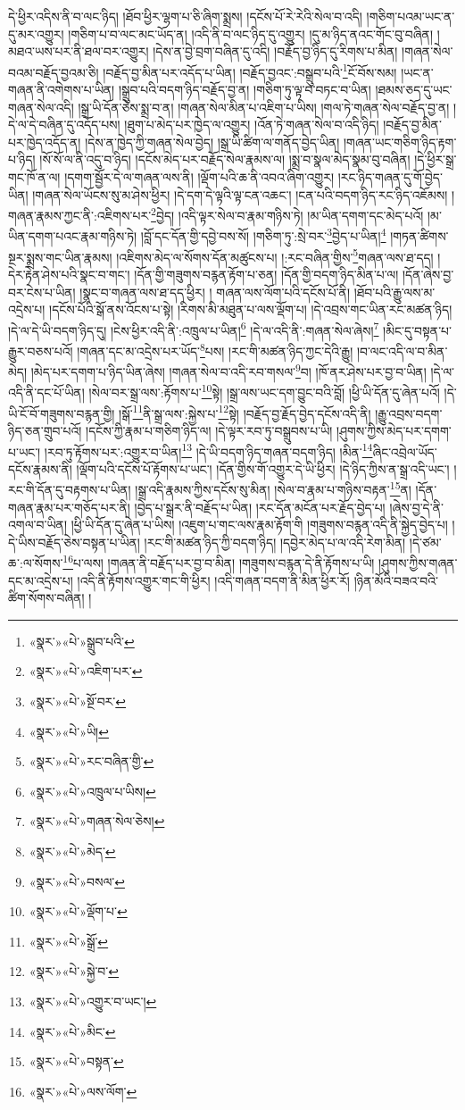 དེ་ཕྱིར་འདིས་ནི་བ་ལང་ཉིད། །ཐོབ་ཕྱིར་ལྷག་པ་ཅི་ཞིག་སྨྲས། །དངོས་པོ་རེ་རེའི་སེལ་བ་འདི། །གཅིག་པའམ་ཡང་ན་དུ་མར་འགྱུར། །གཅིག་པ་བ་ལང་མང་ཡོད་ན། །འདི་ནི་བ་ལང་ཉིད་དུ་འགྱུར། །དུ་མ་ཉིད་ནའང་གོང་བུ་བཞིན། །མཐའ་ཡས་པར་ནི་ཐལ་བར་འགྱུར། །དེས་ན་བྱེ་བྲག་བཞིན་དུ་འདི། །བརྗོད་བྱ་ཉིད་དུ་རིགས་པ་མིན། །གཞན་སེལ་བའམ་བརྗོད་བྱའམ་ཅི། །བརྗོད་བྱ་མིན་པར་འདོད་པ་ཡིན། །བརྗོད་བྱའང་:བསྒྲུབ་པའི་\footnote{«སྣར་»«པེ་»སྒྲུབ་པའི་}ངོ་བོས་སམ། །ཡང་ན་གཞན་ནི་འགེགས་པ་ཡིན། །སྒྲུབ་པའི་བདག་ཉིད་བརྗོད་བྱ་ན། །གཅིག་ཏུ་ལྟ་བ་བཏང་བ་ཡིན། །ཐམས་ཅད་དུ་ཡང་གཞན་སེལ་འདི། །སྒྲ་ཡི་དོན་ཅེས་སྨྲ་བ་ན། །གཞན་སེལ་མིན་པ་འཇིག་པ་ཡིས། །གལ་ཏེ་གཞན་སེལ་བརྗོད་བྱ་ན། །དེ་ལ་དེ་བཞིན་དུ་འདོད་པས། །ཐུག་པ་མེད་པར་ཁྱེད་ལ་འགྱུར། །འོན་ཏེ་གཞན་སེལ་བ་འདི་ཉིད། །བརྗོད་བྱ་མིན་པར་ཁྱེད་འདོད་ན། །དེས་ན་ཁྱེད་ཀྱི་གཞན་སེལ་བྱེད། །སྒྲ་ཡི་ཚིག་ལ་གནོད་བྱེད་ཡིན། །གཞན་ཡང་གཅིག་ཉིད་རྟག་པ་ཉིད། །སོ་སོ་ལ་ནི་འདུ་བ་ཉིད། །དངོས་མེད་པར་བརྗོད་སེལ་རྣམས་ལ། །སྨྲ་བ་སྣལ་མེད་སྣམ་བུ་བཞིན། །དེ་ཕྱིར་སྒྲ་གང་ཁོ་ན་ལ། །དགག་སྦྱོར་དེ་ལ་གཞན་ལས་ནི། །ལྡོག་པའི་ཆ་ནི་འབའ་ཞིག་འགྱུར། །རང་ཉིད་གཞན་དུ་གོ་བྱེད་ཡིན། །གཞན་སེལ་ཡོངས་སུ་མ་ཤེས་ཕྱིར། །དེ་དག་དེ་ལྟའི་ལྟ་ངན་འཆང་། །ངན་པའི་བདག་ཉིད་རང་ཉིད་འཇོམས། །གཞན་རྣམས་ཀྱང་ནི་:འཇིགས་པར་\footnote{«སྣར་»«པེ་»འཇིག་པར་}བྱེད། །འདི་ལྟར་སེལ་བ་རྣམ་གཉིས་ཏེ། །མ་ཡིན་དགག་དང་མེད་པའོ། །མ་ཡིན་དགག་པའང་རྣམ་གཉིས་ཏེ། །བློ་དང་དོན་གྱི་དབྱེ་བས་སོ། །གཅིག་ཏུ་:སྲེ་བར་\footnote{«སྣར་»«པེ་»སྔོ་བར་}བྱེད་པ་ཡིན།\footnote{«སྣར་»«པེ་»ཡི།} །གཏན་ཚིགས་སྔར་སྨྲས་གང་ཡིན་རྣམས། །འཇིགས་མེད་ལ་སོགས་དོན་མཚུངས་པ། །:རང་བཞིན་གྱིས་\footnote{«སྣར་»«པེ་»རང་བཞིན་གྱི་}གཞན་ལས་ཐ་དད། །དེར་རྟེན་ཤེས་པའི་སྣང་བ་གང་། །དོན་གྱི་གཟུགས་བརྙན་རྟོག་པ་ཅན། །དོན་གྱི་བདག་ཉིད་མིན་པ་ལ། །དོན་ཞེས་བྱ་བར་ངེས་པ་ཡིན། །སྣང་བ་གཞན་ལས་ཐ་དད་ཕྱིར། །
གཞན་ལས་ལོག་པའི་དངོས་པོ་ནི། །ཐོབ་པའི་རྒྱུ་ལས་མ་འདྲེས་པ། །དངོས་པོའི་སྒོ་ནས་འོངས་པ་སྟེ། །རིགས་མི་མཐུན་པ་ལས་ལྡོག་པ། །དེ་འབྲས་གང་ཡིན་རང་མཚན་ཉིད། །དེ་ལ་དེ་ཡི་བདག་ཉིད་དུ། །ངེས་ཕྱིར་འདི་ནི་:འཁྲུལ་པ་ཡིན།\footnote{«སྣར་»«པེ་»འཁྲུལ་པ་ཡིས།} །དེ་ལ་འདི་ནི་:གཞན་སེལ་ཞེས།\footnote{«སྣར་»«པེ་»གཞན་སེལ་ཅེས།} །མིང་དུ་བསྟན་པ་རྒྱུར་བཅས་པའོ། །གཞན་དང་མ་འདྲེས་པར་ཡོད་\footnote{«སྣར་»«པེ་»མེད་}པས། །རང་གི་མཚན་ཉིད་ཀྱང་དེའི་རྒྱུ། །བ་ལང་འདི་ལ་བ་མིན་མེད། །མེད་པར་དགག་པ་ཉིད་ཡིན་ཞེས། །གཞན་སེལ་བ་འདི་རབ་གསལ་\footnote{«སྣར་»«པེ་»བསལ་}བ། །ཁོ་ནར་ཤེས་པར་བྱ་བ་ཡིན། །དེ་ལ་འདི་ནི་དང་པོ་ཡིན། །སེལ་བར་སྒྲ་ལས་:རྟོགས་པ་\footnote{«སྣར་»«པེ་»ལྡོག་པ་}སྟེ། །སྒྲ་ལས་ཡང་དག་བྱུང་བའི་བློ། །ཕྱི་ཡི་དོན་དུ་ཞེན་པའོ། །དེ་ཡི་ངོ་བོ་གཟུགས་བརྙན་གྱི། །སྒོ་\footnote{«སྣར་»«པེ་»སྒྲོ་}ནི་སྒྲ་ལས་:སྐྱེས་པ་\footnote{«སྣར་»«པེ་»སྐྱེ་བ་}སྟེ། །བརྗོད་བྱ་རྗོད་བྱེད་དངོས་འདི་ནི། །རྒྱུ་འབྲས་བདག་ཉིད་ཅན་གྲུབ་པའོ། །དངོས་ཀྱི་རྣམ་པ་གཅིག་ཉིད་ལ། །དེ་ལྟར་རབ་ཏུ་བསྒྲུབས་པ་ཡི། །ཤུགས་ཀྱིས་མེད་པར་དགག་པ་ཡང་། །རབ་ཏུ་རྟོགས་པར་:འགྱུར་བ་ཡིན།\footnote{«སྣར་»«པེ་»འགྱུར་བ་ཡང་།} །དེ་ཡི་བདག་ཉིད་གཞན་བདག་ཉིད། །མིན་\footnote{«སྣར་»«པེ་»མིང་}ཞིང་འབྲེལ་ཡོད་དངོས་རྣམས་ནི། །ལྡོག་པའི་དངོས་པོ་རྟོགས་པ་ཡང་། །དོན་གྱིས་གོ་འགྱུར་དེ་ཡི་ཕྱིར། །དེ་ཉིད་ཀྱིས་ན་སྒྲ་འདི་ཡང་། །རང་གི་དོན་དུ་བརྟགས་པ་ཡིན། །སྒྲ་འདི་རྣམས་ཀྱིས་དངོས་སུ་མིན། །སེལ་བ་རྣམ་པ་གཉིས་བརྟན་\footnote{«སྣར་»«པེ་»བསྟན་}ན། །དོན་གཞན་རྣམ་པར་གཅོད་པར་ནི། །བྱེད་པ་སྒྲར་ནི་བརྗོད་པ་ཡིན། །རང་དོན་མངོན་པར་རྗོད་བྱེད་པ། །ཞེས་བྱ་དེ་ནི་འགལ་བ་ཡིན། །ཕྱི་ཡི་དོན་དུ་ཞེན་པ་ཡིས། །འཇུག་པ་གང་ལས་རྣམ་རྟོག་གི །གཟུགས་བརྙན་འདི་ནི་སྐྱེད་བྱེད་པ། །དེ་ཡིས་བརྗོད་ཅེས་བསྟན་པ་ཡིན། །རང་གི་མཚན་ཉིད་ཀྱི་བདག་ཉིད། །དབྱེར་མེད་པ་ལ་འདི་རེག་མིན། །དེ་ཙམ་ཆ་:ལ་སོགས་\footnote{«སྣར་»«པེ་»ལས་ལོག་}པ་ལས། །གཞན་ནི་བརྗོད་པར་བྱ་བ་མིན། །གཟུགས་བརྙན་དེ་ནི་རྟོགས་པ་ཡི། །ཤུགས་ཀྱིས་གཞན་དང་མ་འདྲེས་པ། །འདི་ནི་རྟོགས་འགྱུར་གང་གི་ཕྱིར། །འདི་གཞན་བདག་ནི་མིན་ཕྱིར་རོ། །ཉིན་མོའི་བཟའ་བའི་ཚིག་སོགས་བཞིན། །
